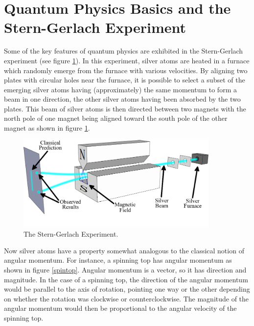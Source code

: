 \section{Quantum Physics Basics and the Stern-Gerlach Experiment}
Some of the key features of quantum physics are exhibited in the Stern-Gerlach experiment (see figure \ref{stern}).
In this experiment, silver atoms are heated in a furnace which randomly emerge from the furnace with various velocities. By aligning two plates with circular holes near the furnace, it is possible to select a subset of the emerging silver atoms having (approximately) the same momentum to form a beam in one direction, the other silver atoms having been absorbed by the two plates. This beam of silver atoms is then directed between two magnets with the north pole of one magnet being aligned toward the south pole of the other magnet as shown in figure \ref{stern}.
\begin{figure}[ht!]
\captionsetup{justification=justified}
\centering
\includegraphics[width=100mm]{Chapter01/Stern-Gerlach_experiment_svg.png}
\caption[Caption for LOF]{The Stern-Gerlach Experiment.\protect\footnotemark}
\label{stern}
\end{figure}
Now silver atoms have a property somewhat analogous to the classical notion of angular momentum. For instance, a spinning top has angular momentum as shown in figure \ref{spintop}. Angular momentum is a vector, so it has direction and magnitude. In the case of a spinning top, the direction of the angular momentum would be parallel to the axis of rotation, pointing one way or the other depending on whether the rotation was clockwise or counterclockwise. The magnitude of the angular momentum would then be proportional to the angular velocity of the spinning top. 
